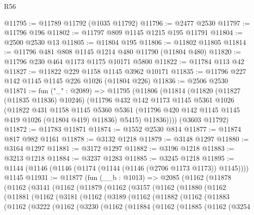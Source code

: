 \begin{lexlean}{R56}
\begin{coremodule}
@11795 := @11789 @11792 (@1035 @11792)
@11796 := @2477 @2530
@11797 := @11796 @196
@11802 := @11797 @809 @1145 @1215 @195 @11791
@11804 := @2500 @2530 @13
@11805 := @11804 @195
@11806 := @11802 @11805
@11814 := @11796 @481 @808 @1145 @1214 @480 @11790 (@11804 @480)
@11820 := @11796 @230 @464 @1173 @1175 @10171 @5800
@11822 := @11784 @113 @42
@11827 := @11822 @229 @1158 @1145 @3962 @10171
@11835 := @11796 @227 @142 @1145 @1145 @226 @1026 (@11804 @226)
@11836 := @2506 @2530
@11871 := fun ("_" : @2089) =>
  @11795
    (@11806
      (@11814
        (@11820
          (@11827 (@11835 @11836) @10246)
          (@11796
            @432
            @142
            @1173
            @1145
            @5361
            @1026
            (@11822
              @431
              @1158
              @1145
              @5360
              @5361
              (@11796 @420 @142 @1145 @1145 @419 @1026 (@11804 @419) @11836)
              @5415)
            @11836))))
    (@3603 @11792)
@11872 := @11783 @11871
@11874 := @1552 @2530 @814
@11877 := @11874 @817 @982 @1161
@11878 := @3132 @1218
@11879 := @3148 @1297
@11880 := @3164 @1297
@11881 := @3172 @1297
@11882 := @3196 @1218
@11883 := @3213 @1218
@11884 := @3237 @1283
@11885 := @3245 @1218
@11895 := @1144 (@1146 (@1146 (@1174 (@1144 (@1146 (@2706 @1173 @1173)) @1145)))) @1145
@11931 := @11877
    (fun (__b : @1013) =>
    @2085
      (@1162
        (@11878
          (@1162
            (@3141
              (@1162
                (@11879
                  (@1162
                    (@3157
                      (@1162
                        (@11880
                          (@1162
                            (@11881
                              (@1162
                                (@3181
                                  (@1162
                                    (@3189
                                      (@1162
                                        (@11882
                                          (@1162
                                            (@11883
                                              (@1162
                                                (@3222
                                                  (@1162
                                                    (@3230
                                                      (@1162
                                                        (@11884
                                                          (@1162
                                                            (@11885
                                                              (@1162
                                                                (@3254

\end{coremodule}
\end{lexlean}

